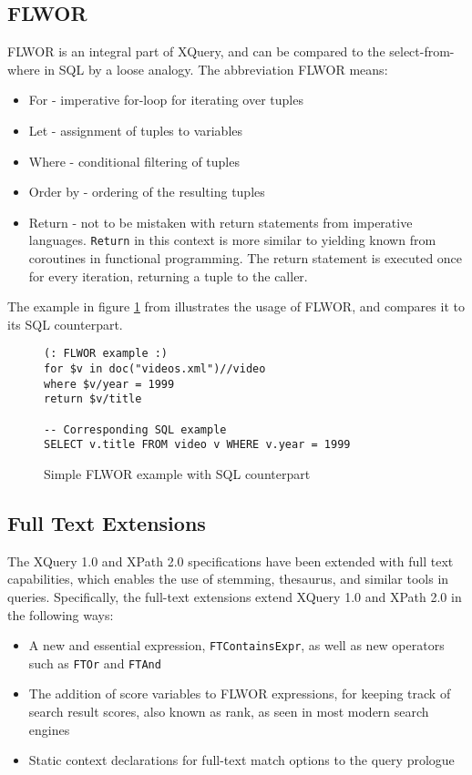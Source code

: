 \subsection{FLWOR}
FLWOR is an integral part of XQuery, and can be compared to the
select-from-where in SQL by a loose analogy. The abbreviation FLWOR means:
\begin{itemize}
\item For - imperative for-loop for iterating over tuples
\item Let - assignment of tuples to variables
\item Where - conditional filtering of tuples
\item Order by - ordering of the resulting tuples
\item Return - not to be mistaken with return statements from imperative
languages. \verb!Return! in this context is more similar to yielding known from
coroutines in functional programming. The return statement is executed once for
every iteration, returning a tuple to the caller.
\end{itemize}
The example in figure \ref{code:theory:flwor} from \cite{styl00} illustrates
the usage of FLWOR, and  compares it to its SQL counterpart.
\begin{figure}
\begin{Verbatim}
(: FLWOR example :)
for $v in doc("videos.xml")//video
where $v/year = 1999
return $v/title

-- Corresponding SQL example 
SELECT v.title FROM video v WHERE v.year = 1999
\end{Verbatim}
\caption[Simple FLWOR example]{Simple FLWOR example with SQL counterpart}
\label{code:theory:flwor}
\end{figure}

\subsection{Full Text Extensions}
The XQuery 1.0  and XPath 2.0 specifications have been extended with full text
capabilities\cite{w3c02}, which enables the use of stemming, thesaurus,
and similar tools in queries. Specifically, the full-text extensions
extend XQuery 1.0 and XPath 2.0 in the following ways:
\begin{itemize}
\item A new and essential expression, \verb!FTContainsExpr!, as well as new operators
such as \verb!FTOr! and \verb!FTAnd!
\item The addition of score variables to FLWOR expressions, for keeping track
of search result scores, also known as rank, as seen in most modern search
engines 
\item Static context declarations for full-text match options to the query
prologue 
\end{itemize}

